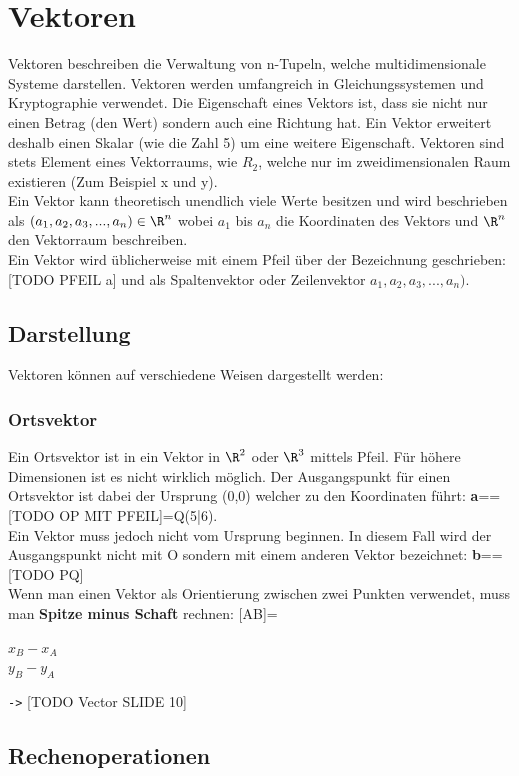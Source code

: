\documentclass{article}
\begin{document}
	\section{Vektoren}
	Vektoren beschreiben die Verwaltung von n-Tupeln, welche multidimensionale Systeme darstellen. Vektoren werden umfangreich in Gleichungssystemen und Kryptographie verwendet. Die Eigenschaft eines Vektors ist, dass sie nicht nur einen Betrag (den Wert) sondern auch eine Richtung hat. Ein Vektor erweitert deshalb einen Skalar (wie die Zahl 5) um eine weitere Eigenschaft. Vektoren sind stets Element eines Vektorraums, wie $R_2$, welche nur im zweidimensionalen Raum existieren (Zum Beispiel x und y). \\
	Ein Vektor kann theoretisch unendlich viele Werte besitzen und wird beschrieben als $(a_1,a_2,a_3,...,a_n)\in \R^n$ wobei $a_1$ bis $a_n$ die Koordinaten des Vektors und $\R^n$ den Vektorraum beschreiben. \\
	Ein Vektor wird üblicherweise mit einem Pfeil über der Bezeichnung geschrieben: [TODO PFEIL a] und als Spaltenvektor oder Zeilenvektor $a_1,a_2,a_3,...,a_n)$. \\
	\subsection{Darstellung}
	Vektoren können auf verschiedene Weisen dargestellt werden:
	\subsubsection{Ortsvektor}
	Ein Ortsvektor ist in ein Vektor in $\R^2$ oder $\R^3$ mittels Pfeil. Für höhere Dimensionen ist es nicht wirklich möglich. Der Ausgangspunkt für einen Ortsvektor ist dabei der Ursprung (0,0) welcher zu den Koordinaten führt: \textbf{a}==[TODO OP MIT PFEIL]=Q(5|6). \\
	Ein Vektor muss jedoch nicht vom Ursprung beginnen. In diesem Fall wird der Ausgangspunkt nicht mit O sondern mit einem anderen Vektor bezeichnet: \textbf{b}==[TODO PQ] \\
	Wenn man einen Vektor als Orientierung zwischen zwei Punkten verwendet, muss man \textbf{Spitze minus Schaft} rechnen: [AB]=\begin{pmatrix}$x_B-x_A$ \\ $y_B-y_A$ \end{pmatrix} \texttt{->} [TODO Vector SLIDE 10]
	\subsection{Rechenoperationen}
\end{document}
